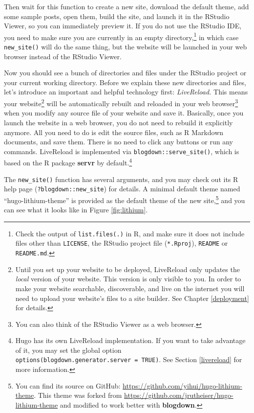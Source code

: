 \documentclass[12pt,]{krantz}
\theoremstyle{definition}
\theoremstyle{definition}
\theoremstyle{definition}
\theoremstyle{remark}
\begin{document}
Then wait for this function to create a new site, download the default
theme, add some sample posts, open them, build the site, and launch it
in the RStudio Viewer, so you can immediately preview it. If you do not
use the RStudio IDE, you need to make sure you are currently in an empty
directory,\footnote{Check the output of
  \texttt{list.files(\textquotesingle{}.\textquotesingle{})} in R, and
  make sure it does not include files other than \texttt{LICENSE}, the
  RStudio project file (\texttt{*.Rproj}), \texttt{README} or
  \texttt{README.md}.} in which case \texttt{new\_site()} will do the
same thing, but the website will be launched in your web browser instead
of the RStudio Viewer.

Now you should see a bunch of directories and files under the RStudio
project or your current working directory. Before we explain these new
directories and files, let's introduce an important and helpful
technology first: \emph{LiveReload.} This means your
website\footnote{Until you set up your website to be deployed,
  LiveReload only updates the \emph{local} version of your website. This
  version is only visible to you. In order to make your website
  searchable, discoverable, and live on the internet you will need to
  upload your website's files to a site builder. See Chapter
  \ref{deployment} for details.} will be automatically rebuilt and
reloaded in your web browser\footnote{You can also think of the RStudio
  Viewer as a web browser.} when you modify any source file of your
website and save it. Basically, once you launch the website in a web
browser, you do not need to rebuild it explicitly anymore. All you need
to do is edit the source files, such as R Markdown documents, and save
them. There is no need to click any buttons or run any commands.
LiveReload is implemented via
\texttt{blogdown::serve\_site()}, which
is based on the R package \textbf{servr} \citep{R-servr} by
default.\footnote{Hugo has its own LiveReload implementation. If you
  want to take advantage of it, you may set the global option
  \texttt{options(blogdown.generator.server\ =\ TRUE)}. See Section
  \ref{livereload} for more information.}

The \texttt{new\_site()} function has several arguments, and you may
check out its R help page (\texttt{?blogdown::new\_site}) for details. A
minimal default theme named ``hugo-lithium-theme'' is provided as the
default theme of the new site,\footnote{You can find its source on
  GitHub: \url{https://github.com/yihui/hugo-lithium-theme}. This theme
  was forked from \url{https://github.com/jrutheiser/hugo-lithium-theme}
  and modified to work better with \textbf{blogdown}.} and you can see
what it looks like in Figure \ref{fig:lithium}.
\end{document}
